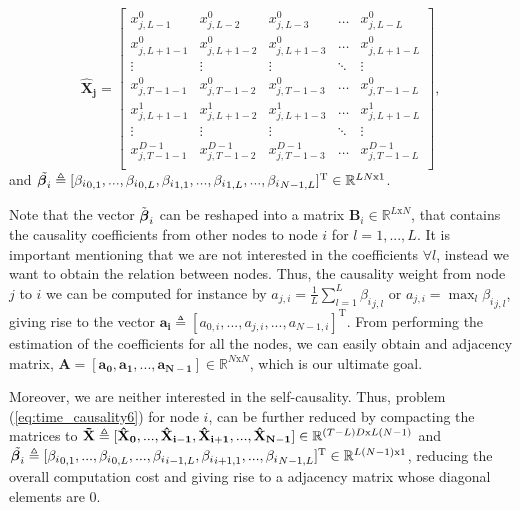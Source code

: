 \documentclass[10pt,conference,compsocconf]{IEEEtran}
\begin{document}
\begin{equation}
\mathbf{\hat{X}_{j}}=\begin{bmatrix}
    x_{j,L-1}^0       & x_{j,L-2}^0 & x_{j,L-3}^0 & \dots & x_{j,L-L}^0 \\
    x_{j,L+1-1}^0       & x_{j,L+1-2}^0 & x_{j,L+1-3}^0 & \dots & x_{j,L+1-L}^0 \\
    \vdots & \vdots & \vdots & \ddots & \vdots \\
    x_{j,T-1-1}^0      & x_{j,T-1-2}^0 & x_{j,T-1-3}^0 & \dots & x_{j,T-1-L}^0 \\
    x_{j,L+1-1}^1       & x_{j,L+1-2}^1 & x_{j,L+1-3}^1 & \dots & x_{j,L+1-L}^1 \\
    \vdots & \vdots & \vdots & \ddots & \vdots \\
   x_{j,T-1-1}^{D-1}      & x_{j,T-1-2}^{D-1} & x_{j,T-1-3}^{D-1} & \dots & x_{j,T-1-L}^{D-1} \\
\end{bmatrix},
\label{eq:time_causality6}
\end{equation}
and $\Tilde{\boldsymbol\beta_i}\triangleq[{\beta_i}_{0,1},...,{\beta_i}_{0,L},{\beta_i}_{1,1},...,{\beta_i}_{1,L},...,{\beta_i}_{N-1,L}]^\mathrm{T}\in{\mathbb{R}^{LN\mathrm{x}1}}$. 

Note that the vector $\Tilde{\boldsymbol\beta}_i$ can be reshaped into a matrix ${\mathbf{B}_i\in{\mathbb{R}^{L\mathrm{x}N}}}$, that contains the causality coefficients from other nodes to node $i$ for ${l=1,...,L}$. 
It is important mentioning that we are not interested in the coefficients $\forall{l}$, instead we want to obtain the relation between nodes. Thus, the causality weight from node ${j}$ to ${i}$ we can be computed for instance by $a_{j,i}=\frac{1}{L}\sum_{l=1}^{L}{{\beta_i}_{j,l}}$ or $a_{j,i}=\operatorname*{max}_{l}{{\beta_i}_{j,l}}$, giving rise to the vector $\mathbf{a_{i}}\triangleq[a_{0,i},...,a_{j,i},...,a_{N-1,i}]^\mathrm{T}$. From performing the estimation of the coefficients for all the nodes, we can easily obtain and adjacency matrix, $\mathbf{A}=[\mathbf{a_{0}},\mathbf{a_{1}},...,\mathbf{a_{N-1}}] \in{\mathbb{R}^{N\mathrm{x}N}}$, which is our ultimate goal.

Moreover, we are neither interested in the self-causality. Thus, problem  (\ref{eq:time_causality6}) for node ${i}$, can be further reduced by compacting the matrices to $\mathbf{\Tilde{X}}\triangleq[\mathbf{\hat{X}_0},...,\mathbf{\hat{X}_{i-1}},\mathbf{\hat{X}_{i+1}},...,\mathbf{\hat{X}_{N-1}}]\in{\mathbb{R}^{(T-L)D\mathrm{x}L(N-1)}}$ and $\Tilde{\boldsymbol\beta_i}\triangleq[{\beta_i}_{0,1},...,{\beta_i}_{0,L},...,{\beta_i}_{i-1,L},{\beta_i}_{i+1,1},...,{\beta_i}_{N-1,L}]^\mathrm{T}\in{\mathbb{R}^{L(N-1)\mathrm{x}1}}$, reducing the overall computation cost and giving rise to a adjacency matrix whose diagonal elements are 0.
 
\end{document}
